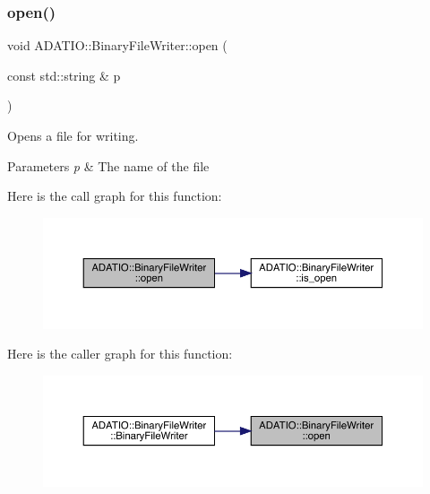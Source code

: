 \subsubsection{\texorpdfstring{open()}{open()}\hspace{0.1cm}{\footnotesize\ttfamily [1/3]}}
{\footnotesize\ttfamily void A\+D\+A\+T\+I\+O\+::\+Binary\+File\+Writer\+::open (\begin{DoxyParamCaption}\item[{const std\+::string \&}]{p }\end{DoxyParamCaption})}

Opens a file for writing. 
\begin{DoxyParams}{Parameters}
{\em p} & The name of the file \\
\hline
\end{DoxyParams}
Here is the call graph for this function\+:
\nopagebreak
\begin{figure}[H]
\begin{center}
\leavevmode
\includegraphics[width=350pt]{dc/d11/classADATIO_1_1BinaryFileWriter_a943ba19816b403b36f50f72740ea856a_cgraph}
\end{center}
\end{figure}
Here is the caller graph for this function\+:
\nopagebreak
\begin{figure}[H]
\begin{center}
\leavevmode
\includegraphics[width=350pt]{dc/d11/classADATIO_1_1BinaryFileWriter_a943ba19816b403b36f50f72740ea856a_icgraph}
\end{center}
\end{figure}
\mbox{\label{classADATIO_1_1BinaryFileWriter_a943ba19816b403b36f50f72740ea856a}} 

